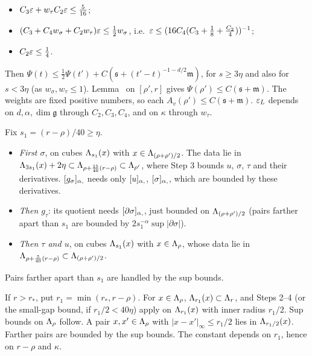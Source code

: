 \begin{detail}
\begin{step}
\begin{itemize}
\item $C_3\varepsilon+w_\tau C_2\varepsilon\le\frac5{16}$;
\item $(C_3+C_4w_\sigma+C_2w_\tau)\varepsilon\le\frac12w_\sigma$, i.e.\ $\varepsilon\le(16C_4(C_3+\frac18+\frac{C_2}4))^{-1}$;
\item $C_2\varepsilon\le\frac14$.
\end{itemize}
Then $\Psi(t)\le\frac12\Psi(t')+C(\mathfrak s+(t'-t)^{-1-d/2}\mathfrak m)$, for $s\ge3\eta$ and also for $s<3\eta$ (as $w_\sigma,w_\tau\le1$). Lemma~ on $[\rho',r]$ gives $\Psi(\rho')\le C(\mathfrak s+\mathfrak m)$. The weights are fixed positive numbers, so each $A_v(\rho')\le C(\mathfrak s+\mathfrak m)$. $\varepsilon_L$ depends on $d,\alpha,\dim\mathfrak g$ through $C_2,C_3,C_4$, and on $\kappa$ through $w_\tau$.
\end{step}
\begin{step}
Fix $s_1=(r-\rho)/40\ge\eta$.
\begin{itemize}
\item \emph{First $\sigma$}, on cubes $\Lambda_{s_1}(x)$ with $x\in\Lambda_{(\rho+\rho')/2}$. The data lie in $\Lambda_{3s_1}(x)+2\eta\subset\Lambda_{\rho+\frac{15}{40}(r-\rho)}\subset\Lambda_{\rho'}$, where Step 3 bounds $u$, $\sigma$, $\tau$ and their derivatives. $[g_\sigma]_{\alpha,}$ needs only $[u]_{\alpha,}$, $[\sigma]_{\alpha,}$, which are bounded by these derivatives.
\item \emph{Then $g_\tau$}: its quotient needs $[\partial\sigma]_{\alpha,}$, just bounded on $\Lambda_{(\rho+\rho')/2}$ (pairs farther apart than $s_1$ are bounded by $2s_1^{-\alpha}\sup|\partial\sigma|$).
\item \emph{Then $\tau$ and $u$}, on cubes $\Lambda_{s_1}(x)$ with $x\in\Lambda_\rho$, whose data lie in $\Lambda_{\rho+\frac5{40}(r-\rho)}\subset\Lambda_{(\rho+\rho')/2}$.
\end{itemize}
Pairs farther apart than $s_1$ are handled by the sup bounds.
\end{step}
\begin{step}[General $r$]
If $r>r_*$, put $r_1=\min(r_*,r-\rho)$. For $x\in\Lambda_\rho$, $\Lambda_{r_1}(x)\subset\Lambda_r$, and Steps 2--4 (or the small-gap bound, if $r_1/2<40\eta$) apply on $\Lambda_{r_1}(x)$ with inner radius $r_1/2$. Sup bounds on $\Lambda_\rho$ follow. A pair $x,x'\in\Lambda_\rho$ with $|x-x'|_\infty\le r_1/2$ lies in $\Lambda_{r_1/2}(x)$. Farther pairs are bounded by the sup bounds. The constant depends on $r_1$, hence on $r-\rho$ and $\kappa$.
\end{step}
\end{detail}


